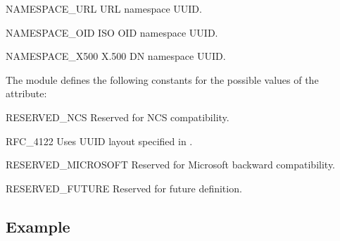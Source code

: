 \begin{datadesc}{NAMESPACE_URL}
URL namespace UUID.
\end{datadesc}

\begin{datadesc}{NAMESPACE_OID}
ISO OID namespace UUID.
\end{datadesc}

\begin{datadesc}{NAMESPACE_X500}
X.500 DN namespace UUID.
\end{datadesc}

The  module defines the following constants
for the possible values of the  attribute:

\begin{datadesc}{RESERVED_NCS}
Reserved for NCS compatibility.
\end{datadesc}

\begin{datadesc}{RFC_4122}
Uses UUID layout specified in .
\end{datadesc}

\begin{datadesc}{RESERVED_MICROSOFT}
Reserved for Microsoft backward compatibility.
\end{datadesc}

\begin{datadesc}{RESERVED_FUTURE}
Reserved for future definition.
\end{datadesc}


\begin{seealso}
\end{seealso}

\subsection{Example \label{uuid-example}}

